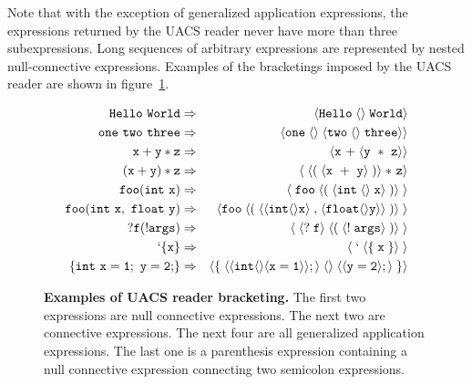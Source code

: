 \documentclass{article}
\begin{document}
Note that with the exception of generalized application expressions,
the expressions returned by the UACS reader never have more than three subexpressions.  Long sequences of arbitrary expressions are represented by nested null-connective expressions.
Examples of the bracketings imposed by the UACS reader are shown in figure~\ref{fig:reader}.

\begin{figure}
\begin{eqnarray*}
  \mathtt{Hello~World} & \Rightarrow & \langle \mathtt{Hello}\;\langle\rangle\; \mathtt{World}\rangle \\
  \mathtt{one~two~three} & \Rightarrow & \langle \mathtt{one}\;\langle\rangle\; \langle \mathtt{two} \;\langle \rangle \;\mathtt{three}\rangle\rangle \\
  \mathtt{x+y*z} & \Rightarrow & \langle \mathtt{x~ +}\;\langle\mathtt{y~*~z}\rangle\rangle \\
  \mathtt{(x+y)*z} & \Rightarrow & \langle\; \langle (\;\langle\mathtt{x~+~y} \rangle \;)\rangle\;\mathtt{*~z}\rangle \\
  \mathtt{foo}(\mathtt{int~x}) & \Rightarrow & \langle\;\mathtt{foo}\;\langle (\;\langle \mathtt{int}\; \langle\rangle \; \mathtt{x}\rangle\;)\rangle\;\rangle \\
  \mathtt{foo(int~x,~float~y)} & \Rightarrow & \langle \mathtt{foo} \; \langle (\; \langle\langle \mathtt{int} \langle\rangle\mathtt{x}\rangle\;
  \mathtt{,}\; \langle\mathtt{float} \langle\rangle \mathtt{y} \rangle\rangle \;) \rangle\;\rangle \\
  ?\mathtt{f}(\mathtt{!args}) & \Rightarrow & \langle\;\langle?\;\mathtt{f}\rangle\;\langle (\;\langle \mathtt{!} \;\mathtt{args}\rangle\;)\rangle\;\rangle \\
  \mathtt{`}\{\mathtt{x}\} & \Rightarrow & \langle\;\mathtt{`} \;\langle \{\;\mathtt{x}\;\}\rangle\;\rangle \\
  \{\mathtt{int~x = 1;~y = 2;}\} & \Rightarrow & \langle\{\;\langle \langle \mathtt{int} \langle \rangle \langle \mathtt{x = 1}\rangle\rangle;\rangle\;\langle\rangle\; \langle\langle \mathtt{y = 2} \rangle ;\rangle\;\}\rangle
\end{eqnarray*}

\caption{{\bf Examples of UACS reader bracketing.} The first two expressions are null connective expressions.  The next two are connective expressions.  The next four are all generalized application expressions.
  The last one is a parenthesis expression containing a null connective expression connecting two semicolon expressions.}
\label{fig:reader}
\end{figure}
\end{document}
